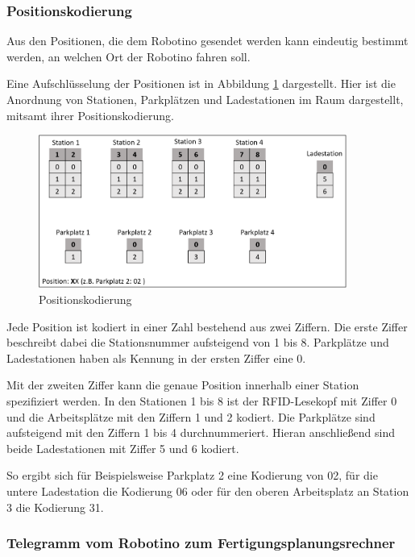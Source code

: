 \subsubsection{Positionskodierung}
\label{sec:Positionskodierung}

Aus den Positionen, die dem Robotino gesendet werden kann eindeutig bestimmt werden, an welchen Ort der Robotino fahren soll. 

Eine Aufschlüsselung der Positionen ist in Abbildung \ref{fig:Positionskodierung} dargestellt. Hier ist die Anordnung von Stationen, Parkplätzen und Ladestationen im Raum dargestellt, mitsamt ihrer Positionskodierung. 

\begin{figure}[htb]
    \centering
    \includegraphics[width=0.9\textwidth]{Abbildungen/Positionskodierung.PNG}
    \caption{Positionskodierung}		
    \label{fig:Positionskodierung}
\end{figure}

Jede Position ist kodiert in einer Zahl bestehend aus zwei Ziffern. Die erste Ziffer beschreibt dabei die Stationsnummer aufsteigend von 1 bis 8. Parkplätze und Ladestationen haben als Kennung in der ersten Ziffer eine 0. 

Mit der zweiten Ziffer kann die genaue Position innerhalb einer Station spezifiziert werden. In den Stationen 1 bis 8 ist der RFID-Lesekopf mit Ziffer 0 und die Arbeitsplätze mit den Ziffern 1 und 2 kodiert. Die Parkplätze sind aufsteigend mit den Ziffern 1 bis 4 durchnummeriert. Hieran anschließend sind beide Ladestationen mit Ziffer 5 und 6 kodiert. 

So ergibt sich für Beispielsweise Parkplatz 2 eine Kodierung von 02, für die untere Ladestation die Kodierung 06 oder für den oberen Arbeitsplatz an Station 3 die Kodierung 31.

\subsubsection{Telegramm vom Robotino zum Fertigungsplanungsrechner}


